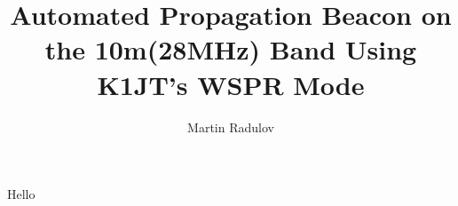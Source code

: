 \documentclass[11pt]{report}
\title{Automated Propagation Beacon on the 10m(28MHz) Band Using K1JT's WSPR Mode }
\date{}
\author{Martin Radulov}
\begin{document}
\maketitle
Hello
	
	
	
\end{document}
